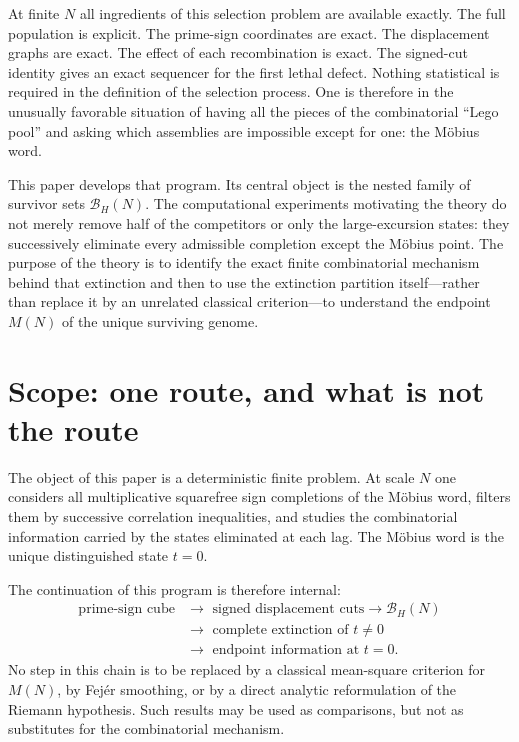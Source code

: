 \documentclass[11pt]{article}
\theoremstyle{definition}
\theoremstyle{remark}
\begin{document}
At finite $N$ all ingredients of this selection problem are available exactly.  The full population is explicit.  The prime-sign coordinates are exact.  The displacement graphs are exact.  The effect of each recombination is exact.  The signed-cut identity gives an exact sequencer for the first lethal defect.  Nothing statistical is required in the definition of the selection process.  One is therefore in the unusually favorable situation of having all the pieces of the combinatorial ``Lego pool'' and asking which assemblies are impossible except for one: the M\"obius word.

This paper develops that program.  Its central object is the nested family of survivor sets $\mathcal B_H(N)$.  The computational experiments motivating the theory do not merely remove half of the competitors or only the large-excursion states: they successively eliminate every admissible completion except the M\"obius point.  The purpose of the theory is to identify the exact finite combinatorial mechanism behind that extinction and then to use the extinction partition itself---rather than replace it by an unrelated classical criterion---to understand the endpoint $M(N)$ of the unique surviving genome.

\section{Scope: one route, and what is not the route}

The object of this paper is a deterministic finite problem.  At scale $N$ one considers all multiplicative squarefree sign completions of the M\"obius word, filters them by successive correlation inequalities, and studies the combinatorial information carried by the states eliminated at each lag.  The M\"obius word is the unique distinguished state $t=0$.

The continuation of this program is therefore internal:
\[
\boxed{
\begin{aligned}
\text{prime-sign cube}&\longrightarrow\text{ signed displacement cuts}\longrightarrow\mathcal B_H(N)\\
&\longrightarrow\text{ complete extinction of }t\ne0\\
&\longrightarrow\text{ endpoint information at }t=0.
\end{aligned}
}
\]
No step in this chain is to be replaced by a classical mean-square criterion for $M(N)$, by Fej\'er smoothing, or by a direct analytic reformulation of the Riemann hypothesis.  Such results may be used as comparisons, but not as substitutes for the combinatorial mechanism.
\end{document}
